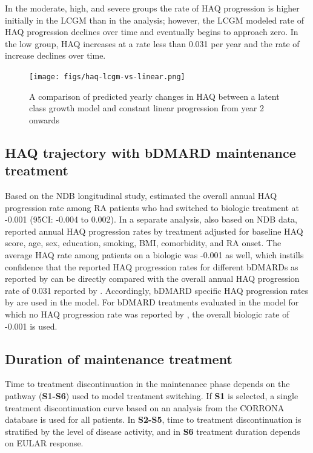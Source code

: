 \documentclass[11pt,final,fleqn]{article}\usepackage[]{graphicx}\usepackage[]{color}
\theoremstyle{plain}
\begin{document}
In the moderate, high, and severe groups the rate of HAQ progression is higher initially in the LCGM than in the \citet{wolfe2010loss} analysis; however, the LCGM modeled rate of HAQ progression declines over time and eventually begins to approach zero. In the low group, HAQ increases at a rate less than 0.031 per year and the rate of increase declines over time. 

\begin{figure}[H]
\centering
\texttt{[image: figs/haq-lcgm-vs-linear.png]}
\caption{A comparison of predicted yearly changes in HAQ between a latent class growth model and constant linear progression from year 2 onwards}\label{fig:lcgm-vs-linear}
\end{figure}

\subsection{HAQ trajectory with bDMARD maintenance treatment}
Based on the NDB longitudinal study, \citet{wolfe2010loss} estimated the overall annual HAQ progression rate among RA patients who had switched to biologic treatment at -0.001 (95CI: -0.004 to 0.002). In a separate analysis, also based on NDB data, \citet{michaud2011treatment} reported annual HAQ progression rates by treatment adjusted for baseline HAQ score, age, sex, education, smoking, BMI, comorbidity, and RA onset. The average HAQ rate among patients on a biologic was -0.001 as well, which instills confidence that the reported HAQ progression rates for different bDMARDs as reported by \citet{michaud2011treatment} can be directly compared with the overall annual HAQ progression rate of 0.031 reported by \citet{wolfe2010loss}. Accordingly, bDMARD specific HAQ progression rates by \citet{michaud2011treatment} are used in the model. For bDMARD treatments evaluated in the model for which no HAQ progression rate was reported by \citet{michaud2011treatment}, the overall biologic rate of -0.001 is used. 

\subsection{Duration of maintenance treatment}\label{duration-of-maintenance-treatment}
Time to treatment discontinuation in the maintenance phase depends on the pathway (\textbf{S1-S6}) used to model treatment switching. If \textbf{S1} is selected, a single treatment discontinuation curve based on an analysis from the CORRONA database is used for all patients. In \textbf{S2-S5}, time to treatment discontinuation is stratified by the level of disease activity, and in \textbf{S6} treatment duration depends on EULAR response.  
\end{document}
